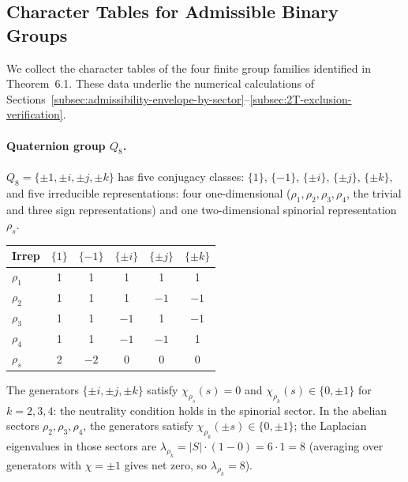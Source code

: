 \subsection{Character Tables for Admissible Binary Groups}
  \label{subsec:character-tables}

  We collect the character tables of the four finite group families identified in
  Theorem~6.1.
  These data underlie the numerical calculations of
  Sections~\ref{subsec:admissibility-envelope-by-sector}--\ref{subsec:2T-exclusion-verification}.

  \paragraph{Quaternion group $Q_8$.}
    $Q_8 = \{\pm 1,\pm i,\pm j,\pm k\}$ has five conjugacy classes:
    $\{1\}$, $\{-1\}$, $\{\pm i\}$, $\{\pm j\}$, $\{\pm k\}$,
    and five irreducible representations: four one-dimensional ($\rho_1,\rho_2,\rho_3,\rho_4$,
    the trivial and three sign representations) and one two-dimensional spinorial
    representation $\rho_s$.

    \begin{center}
      \begin{tabular}{lccccc}
        \hline
        Irrep    & $\{1\}$ & $\{-1\}$ & $\{\pm i\}$ & $\{\pm j\}$ & $\{\pm k\}$ \\
        \hline
        $\rho_1$ & 1       & 1        & 1           & 1           & 1           \\
        $\rho_2$ & 1       & 1        & 1           & $-1$        & $-1$        \\
        $\rho_3$ & 1       & 1        & $-1$        & 1           & $-1$        \\
        $\rho_4$ & 1       & 1        & $-1$        & $-1$        & 1           \\
        $\rho_s$ & 2       & $-2$     & 0           & 0           & 0           \\
        \hline
      \end{tabular}
    \end{center}

    The generators $\{\pm i,\pm j,\pm k\}$ satisfy $\chi_{\rho_s}(s)=0$ and
    $\chi_{\rho_k}(s)\in\{0,\pm 1\}$ for $k=2,3,4$: the neutrality condition holds in
    the spinorial sector.
    In the abelian sectors $\rho_2,\rho_3,\rho_4$, the generators satisfy
    $\chi_{\rho_k}(\pm s)\in\{0,\pm 1\}$; the Laplacian eigenvalues in those sectors
    are $\lambda_{\rho_k}=|S|\cdot(1-0)=6\cdot 1=8$ (averaging over generators
    with $\chi=\pm 1$ gives net zero, so $\lambda_{\rho_k}=8$).

